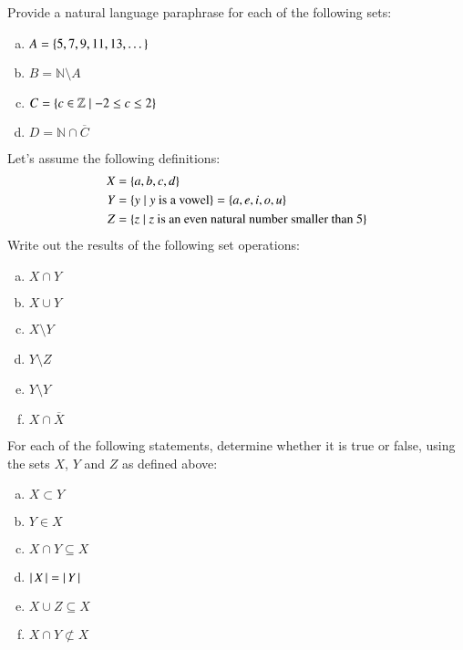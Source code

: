 \documentclass[nobib,nofonts]{tufte-handout}
\begin{document}
\bigskip
\noindent \colorbox{mygray}{\centering
  \begin{minipage}{1.0\textwidth}

    \begin{exercise}
      Provide a natural language paraphrase for each of the following sets:
      \begin{enumerate}[a.]
        \item $A = \left\{5, 7, 9, 11, 13, \dots\right\}$
        \item $B = \mathbb{N} \setminus A$
        \item $C = \left\{c \in \mathbb{Z} \mid -2 \le c \le 2\right\}$
        \item $D = \mathbb{N} \cap \overline{C}$
      \end{enumerate}
    \end{exercise}

    \begin{exercise}
      Let's assume the following definitions:
      \begin{align*}
        X & = \left\{a, b, c, d\right\} \\
        Y & = \left\{y \mid y \text{ is a vowel}\right\} = \left\{a, e, i, o, u\right\} \\
        Z & = \left\{z \mid z \text{ is an even natural number smaller than 5}\right\}
      \end{align*}
      Write out the results of the following set operations:
      \begin{multicols}{3}
      \begin{enumerate}[a.]
        \item $X \cap Y$
        \item $X \cup Y$
        \item $X \setminus Y$
        \item $Y \setminus Z$
        \item $Y \setminus Y$
        \item $X \cap \overline{X}$
      \end{enumerate}
    \end{multicols}
    \end{exercise}

    \begin{exercise}
      For each of the following statements, determine whether it is true or false, using the sets $X$, $Y$ and $Z$ as defined above:
      \begin{multicols}{3}
        \begin{enumerate}[a.]
          \item $X \subset Y$
          \item $Y \in X$
          \item $X \cap Y \subseteq X$
          \item $\left \lvert \, X \, \right\rvert = \left \lvert \, Y \, \right\rvert$
          \item $X \cup Z \subseteq X$
          \item $X \cap Y \not \subset X$
        \end{enumerate}
      \end{multicols}

    \end{exercise}

  \end{minipage}
}
\end{document}
